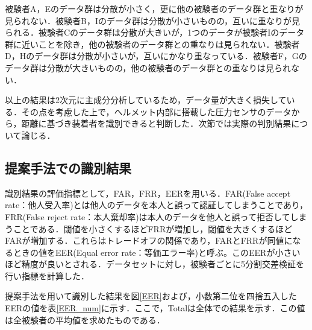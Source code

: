 \documentclass[Japanese]{dicomopapers}
\begin{document}
被験者A，Eのデータ群は分散が小さく，更に他の被験者のデータ群と重なりが見られない．被験者B，Iのデータ群は分散が小さいものの，互いに重なりが見られる．被験者Cのデータ群は分散が大きいが，1つのデータが被験者Iのデータ群に近いことを除き，他の被験者のデータ群との重なりは見られない．被験者D，Hのデータ群は分散が小さいが，互いにかなり重なっている．被験者F，Gのデータ群は分散が大きいものの，他の被験者のデータ群との重なりは見られない．\par
以上の結果は2次元に主成分分析しているため，データ量が大きく損失している．その点を考慮した上で，ヘルメット内部に搭載した圧力センサのデータから，距離に基づき装着者を識別できると判断した．次節では実際の判別結果について論じる．

\subsection{提案手法での識別結果}
識別結果の評価指標として，FAR，FRR，EERを用いる．FAR(False accept rate：他人受入率)とは他人のデータを本人と誤って認証してしまうことであり，FRR(False reject rate：本人棄却率)は本人のデータを他人と誤って拒否してしまうことである．閾値を小さくするほどFRRが増加し，閾値を大きくするほどFARが増加する．これらはトレードオフの関係であり，FARとFRRが同値になるときの値をEER(Equal error rate：等価エラー率)と呼ぶ。このEERが小さいほど精度が良いとされる．データセットに対し，被験者ごとに5分割交差検証を行い指標を計算した．\par
提案手法を用いて識別した結果を図\ref{EER}および，小数第二位を四捨五入したEERの値を表\ref{EER_num}に示す．ここで，Totalは全体での結果を示す．この値は全被験者の平均値を求めたものである．
\end{document}
